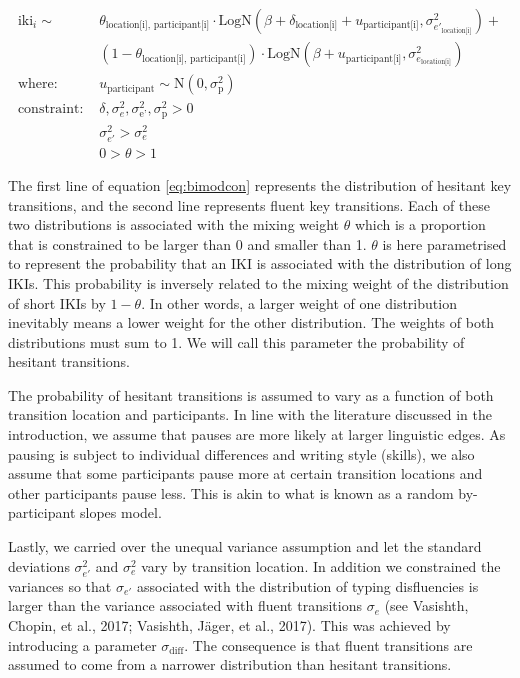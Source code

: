\documentclass[
  english,
  man,floatsintext]{apa7}
\begin{document}
\begin{equation}
\begin{aligned}
\label{eq:bimodcon}
\text{iki}_{i} \sim\text{ } & \theta_\text{location[i], participant[i]} \cdot \text{LogN}(\beta + \delta_\text{location[i]} + u_\text{participant[i]}, \sigma_{e'_\text{location[i]}}^2) + \\
  & (1 - \theta_\text{location[i], participant[i]}) \cdot \text{LogN}(\beta + u_\text{participant[i]}, \sigma_{e_\text{location[i]}}^2)\\
\text{where: } & u_\text{participant} \sim \text{N}(0, \sigma_\text{p}^2) \\
\text{constraint: } & \delta, \sigma_{e}^2, \sigma_\text{e'}^2, \sigma_\text{p}^2>0\\
        & \sigma_{e'}^2 > \sigma_{e}^2\\
        & 0 > \theta > 1
\end{aligned}
\end{equation}

The first line of equation \ref{eq:bimodcon} represents the distribution of hesitant key transitions, and the second line represents fluent key transitions. Each of these two distributions is associated with the mixing weight \(\theta\) which is a proportion that is constrained to be larger than 0 and smaller than 1. \(\theta\) is here parametrised to represent the probability that an IKI is associated with the distribution of long IKIs. This probability is inversely related to the mixing weight of the distribution of short IKIs by \(1-\theta\). In other words, a larger weight of one distribution inevitably means a lower weight for the other distribution. The weights of both distributions must sum to 1. We will call this parameter the probability of hesitant transitions.

The probability of hesitant transitions is assumed to vary as a function of both transition location and participants. In line with the literature discussed in the introduction, we assume that pauses are more likely at larger linguistic edges. As pausing is subject to individual differences and writing style (skills), we also assume that some participants pause more at certain transition locations and other participants pause less. This is akin to what is known as a random by-participant slopes model.

Lastly, we carried over the unequal variance assumption and let the standard deviations \(\sigma_{e'}^2\) and \(\sigma_{e}^2\) vary by transition location. In addition we constrained the variances so that \(\sigma_{e'}\) associated with the distribution of typing disfluencies is larger than the variance associated with fluent transitions \(\sigma_e\) (see Vasishth, Chopin, et al., 2017; Vasishth, Jäger, et al., 2017). This was achieved by introducing a parameter \(\sigma_\text{diff}\). The consequence is that fluent transitions are assumed to come from a narrower distribution than hesitant transitions.
\end{document}
